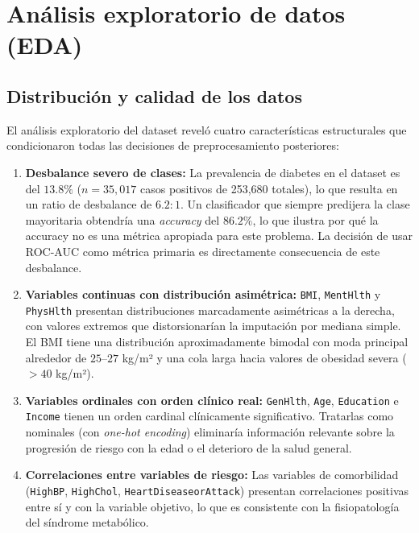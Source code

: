 \documentclass[12pt,a4paper]{article}
\begin{document}
\section{Análisis exploratorio de datos (EDA)}

\subsection{Distribución y calidad de los datos}

El análisis exploratorio del dataset reveló cuatro características estructurales que condicionaron todas las decisiones de preprocesamiento posteriores:

\begin{enumerate}
  \item \textbf{Desbalance severo de clases:} La prevalencia de diabetes en el dataset es del $13.8\%$ ($n=35{,}017$ casos positivos de 253{,}680 totales), lo que resulta en un ratio de desbalance de $6.2:1$. Un clasificador que siempre predijera la clase mayoritaria obtendría una \textit{accuracy} del $86.2\%$, lo que ilustra por qué la accuracy no es una métrica apropiada para este problema. La decisión de usar ROC-AUC como métrica primaria es directamente consecuencia de este desbalance.

  \item \textbf{Variables continuas con distribución asimétrica:} \texttt{BMI}, \texttt{MentHlth} y \texttt{PhysHlth} presentan distribuciones marcadamente asimétricas a la derecha, con valores extremos que distorsionarían la imputación por mediana simple. El BMI tiene una distribución aproximadamente bimodal con moda principal alrededor de $25$--$27$ kg/m² y una cola larga hacia valores de obesidad severa ($>40$ kg/m²).

  \item \textbf{Variables ordinales con orden clínico real:} \texttt{GenHlth}, \texttt{Age}, \texttt{Education} e \texttt{Income} tienen un orden cardinal clínicamente significativo. Tratarlas como nominales (con \textit{one-hot encoding}) eliminaría información relevante sobre la progresión de riesgo con la edad o el deterioro de la salud general.

  \item \textbf{Correlaciones entre variables de riesgo:} Las variables de comorbilidad (\texttt{HighBP}, \texttt{HighChol}, \texttt{HeartDiseaseorAttack}) presentan correlaciones positivas entre sí y con la variable objetivo, lo que es consistente con la fisiopatología del síndrome metabólico.
\end{enumerate}
\end{document}
